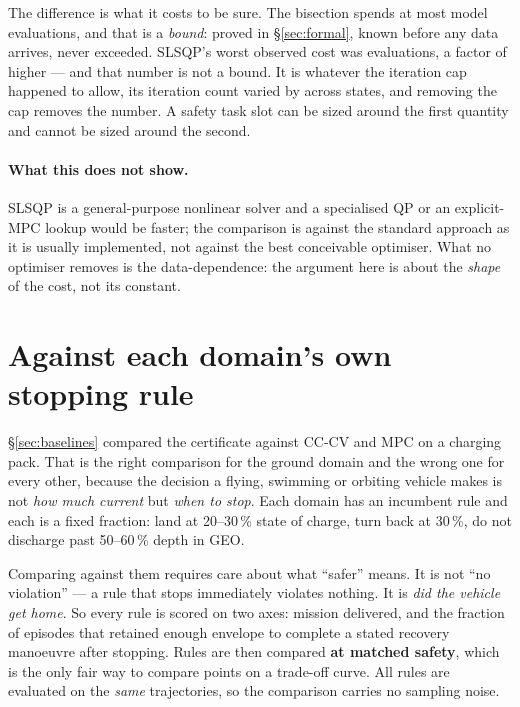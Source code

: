 \documentclass[11pt,letterpaper]{article}
\theoremstyle{definition}
\theoremstyle{remark}
\begin{document}
The difference is what it costs to be sure. The bisection spends at most \bZgEval{} model
evaluations, and that is a \emph{bound}: proved in \S\ref{sec:formal}, known before any data
arrives, never exceeded. SLSQP's worst observed cost was \bMpcMaxEval{} evaluations, a factor of
\bMpcRatio{} higher --- and that number is not a bound. It is whatever the iteration cap
happened to allow, its iteration count varied by \bMpcIterSpread{} across states, and removing
the cap removes the number. A safety task slot can be sized around the first quantity and cannot
be sized around the second.

\paragraph{What this does not show.} SLSQP is a general-purpose nonlinear solver and a
specialised QP or an explicit-MPC lookup would be faster; the comparison is against the standard
approach as it is usually implemented, not against the best conceivable optimiser. What no
optimiser removes is the data-dependence: the argument here is about the \emph{shape} of the
cost, not its constant.



\section{Against each domain's own stopping rule}\label{sec:domainbaselines}

\S\ref{sec:baselines} compared the certificate against CC-CV and MPC on a charging pack. That is
the right comparison for the ground domain and the wrong one for every other, because the
decision a flying, swimming or orbiting vehicle makes is not \emph{how much current} but
\emph{when to stop}. Each domain has an incumbent rule and each is a fixed fraction: land at
20--30\,\% state of charge, turn back at 30\,\%, do not discharge past 50--60\,\% depth in GEO.

Comparing against them requires care about what ``safer'' means. It is not ``no violation'' ---
a rule that stops immediately violates nothing. It is \emph{did the vehicle get home}. So every
rule is scored on two axes: mission delivered, and the fraction of episodes that retained enough
envelope to complete a stated recovery manoeuvre after stopping. Rules are then compared
\textbf{at matched safety}, which is the only fair way to compare points on a trade-off curve.
All rules are evaluated on the \emph{same} trajectories, so the comparison carries no sampling
noise.
\end{document}
